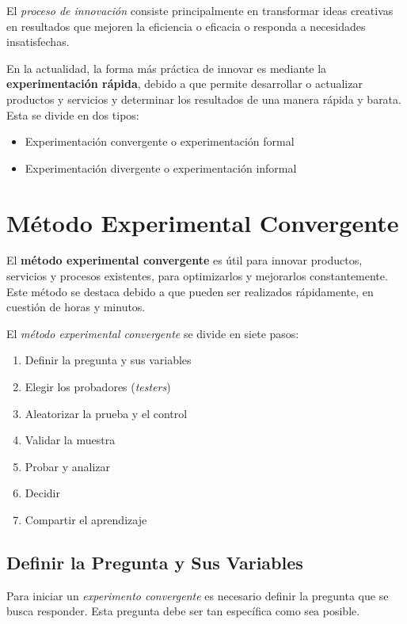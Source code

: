 El \textit{proceso de innovación} consiste principalmente en transformar ideas
creativas en resultados que mejoren la eficiencia o eficacia o responda a
necesidades insatisfechas.

En la actualidad, la forma más práctica de innovar es mediante la \textbf{
	experimentación rápida}, debido a que permite desarrollar o actualizar
productos y servicios y determinar los resultados de una manera rápida y
barata. Esta se divide en dos tipos:

\begin{itemize}
	\item Experimentación convergente o experimentación formal
	\item Experimentación divergente o experimentación informal
\end{itemize}

\clearpage
\section{Método Experimental Convergente}

El \textbf{método experimental convergente}	es útil para innovar productos,
servicios y procesos existentes, para optimizarlos y mejorarlos
constantemente. Este método se destaca debido a que pueden ser realizados
rápidamente, en cuestión de horas y minutos.

El \textit{método experimental convergente} se divide en siete pasos:

\begin{enumerate}
	\item Definir la pregunta y sus variables
	\item Elegir los probadores (\textit{testers})
	\item Aleatorizar la prueba y el control
	\item Validar la muestra
	\item Probar y analizar
	\item Decidir
	\item Compartir el aprendizaje
\end{enumerate}

\subsection{Definir la Pregunta y Sus Variables}

Para iniciar un \textit{experimento convergente} es necesario definir la
pregunta que se busca responder. Esta pregunta debe ser tan específica como sea
posible.

